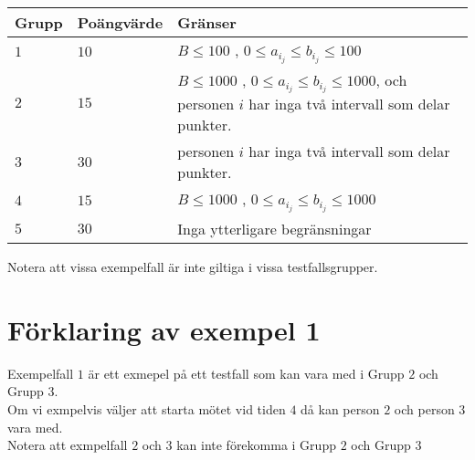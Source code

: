 \noindent
\begin{tabular}{| l | l | l |}
  \hline
  Grupp & Poängvärde & Gränser \\ \hline
  $1$   & $10$        & $B \leq 100$ , $0 \leq a_i_j \leq b_i_j  \leq 100$ \\ \hline
  $2$   & $15$       & $B \leq  1000$ , $0 \leq a_i_j \leq b_i_j  \leq 1000$, och personen $i$ har inga två intervall som delar punkter. \\ \hline
  $3$   & $30$       & personen $i$ har inga två intervall som delar punkter. \\ \hline
  $4$   & $15$       & $B \leq 1000$ , $0 \leq a_i_j \leq b_i_j  \leq 1000$ \\ \hline
  $5$   & $30$       & Inga ytterligare begränsningar \\ \hline
\end{tabular}
Notera att vissa exempelfall är inte giltiga i vissa testfallsgrupper.

\section*{Förklaring av exempel 1}
Exempelfall $1$ är ett exmepel på ett testfall som kan vara med i Grupp $2$ och Grupp $3$.\\ Om vi exmpelvis väljer att starta mötet vid tiden $4$ då kan person $2$ och person $3$ vara med.\\ Notera att exmpelfall $2$ och $3$ kan inte förekomma i Grupp $2$ och Grupp $3$
